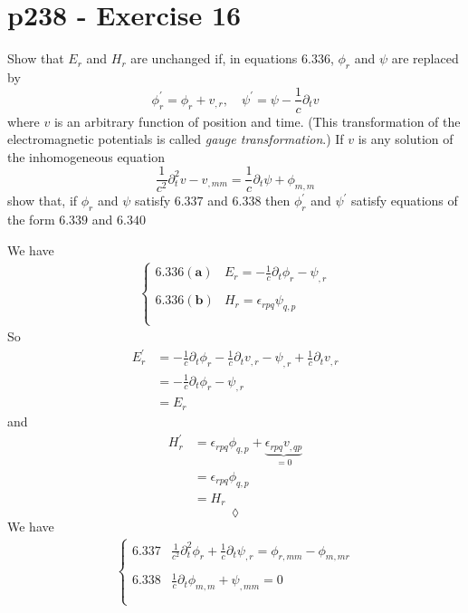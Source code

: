 \section{p238 - Exercise 16}
\begin{tcolorbox}
Show that $E_r$ and $H_r$ are unchanged if, in equations $\mathbf{6.336}$, $\phi_r$ and $\psi$ are replaced by
$$\phi^{'}_r = \phi_r+v_{,r}, \quad \psi^{'} = \psi - \frac{1}{c}\partial_t v$$
where $v$ is an arbitrary function of position and time. (This transformation of the electromagnetic potentials is called \textit{gauge transformation}.) If $v$ is any solution of the inhomogeneous equation $$\frac{1}{c^2}\partial^2_t v - v_{,mm}= \frac{1}{c}\partial_t\psi + \phi_{m,m}$$
show that, if $\phi_r$ and $\psi$ satisfy $\mathbf{6.337}$ and $\mathbf{6.338}$ then $\phi^{'}_r$ and $\psi^{'}$ satisfy equations of the form  $\mathbf{6.339}$ and $\mathbf{6.340}$ 
\end{tcolorbox}
We have 
\begin{align}
\left\{\begin{array}{ll}
\mathbf{6.336(a)}&E_r= -\frac{1}{c}\partial_t \phi_r - \psi_{,r}\\\\
\mathbf{6.336(b)}&H_r=\epsilon_{rpq}\psi_{q,p}\\\\
\end{array}\right.
\end{align}
So
\begin{align}
E^{'}_r&= -\frac{1}{c}\partial_t \phi_r-\frac{1}{c}\partial_t v_{,r} - \psi_{,r}+\frac{1}{c}\partial_t v_{,r}\\
&= -\frac{1}{c}\partial_t \phi_r- \psi_{,r}\\
&=E_r
\end{align}
and 
\begin{align}
H^{'}_r&= \epsilon_{rpq}\phi_{q,p}+\underbrace{\epsilon_{rpq}v_{,qp}}_{=0}\\
&=\epsilon_{rpq}\phi_{q,p}\\
&=H^{}_r
\end{align}
$$\lozenge$$
We have 
\begin{align}
\left\{\begin{array}{ll}
\mathbf{6.337}&\frac{1}{c^2}\partial^2_t \phi_r +\frac{1}{c} \partial_t\psi_{,r}= \phi_{r,mm}- \phi_{m,mr}\\\\
\mathbf{6.338}&\frac{1}{c}\partial_t \phi_{m,m} +\psi_{,mm}=0\\\\
\end{array}\right.
\end{align}

